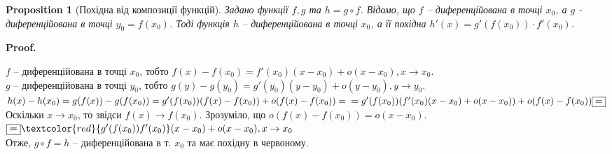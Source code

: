\documentclass[a4paper, 14pt]{article}
\makeatletter
\def\qed{$\blacksquare$}
\theoremstyle{theoremdd}
\theoremstyle{theoremdd}
\theoremstyle{theoremdd}
\theoremstyle{theoremdd}
\theoremstyle{theoremdd}
\newtheorem{proposition}[theorem]{Proposition}
\theoremstyle{theoremdd}
\theoremstyle{theoremdd}
\theoremstyle{theoremdd}
\renewenvironment{proof}[1][Proof.\\]{\par
\pushQED{\hfill \qed}%
\normalfont \topsep6\p@\@plus6\p@\relax
\trivlist
\item\relax
{\bfseries
#1\@addpunct{.}}\hspace\labelsep\ignorespaces
}{%
\popQED\endtrivlist\@endpefalse
}
\makeatother
\begin{document}
\iffalse
\begin{proof}
Альтернативне доведення буде проводитись за допомогою минуло доведеного твердження:\\
1) $(cf)'(x_0) = \displaystyle \lim_{x \to x_0} \frac{cf(x)-cf(x_0)}{x-x_0} = c f'(x_0) \\ \Rightarrow cf$ - диференційована в т. $x_0$.
\bigskip \\
2) $(f+g)'(x_0) = \displaystyle \lim_{x \to x_0} \frac{f(x)+g(x) - f(x_0)-g(x_0)}{x-x_0} = \lim_{x \to x_0} \frac{f(x) - f(x_0)}{x-x_0} + \lim_{x \to x_0} \frac{g(x) - g(x_0)}{x-x_0} = \\ = f'(x_0) + g'(x_0) \\ \Rightarrow f+g$ - диференційована в т. $x_0$.
\bigskip \\
3) $(f \cdot g)'(x_0) = \displaystyle \lim_{x \to x_0} \frac{f(x)g(x) - f(x_0)g(x_0)}{x-x_0} = \lim_{x \to x_0} \frac{f(x)g(x) - f(x_0)g(x) + f(x_0)g(x) - f(x_0)g(x_0)}{x-x_0} = \\ = \lim_{x \to x_0} g(x) \frac{f(x)-f(x_0)}{x-x_0} + f(x_0) \lim_{x \to x_0} \frac{g(x)-g(x_0)}{x-x_0} = f'(x_0)g(x_0) + f(x_0)g'(x_0) \\ \Rightarrow fg$ - диференційована в т. $x_0$.
\bigskip \\
4) $\displaystyle \left(\frac{f}{g}\right)'(x_0) = \lim_{x \to x_0} \frac{\textstyle \frac{f(x)}{g(x)} - \frac{f(x_0)}{g(x_0)}}{x-x_0} = \lim_{x \to x_0} \frac{f(x)g(x_0)-f(x_0)g(x)}{g(x)g(x_0)(x-x_0)} \overset{\textrm{як в 3)}}{=} \frac{1}{(g(x_0))^2} (f'(x_0)g(x_0) - f(x_0)g'(x_0)) \\ \Rightarrow \frac{f}{g}$ - диференційована в т. $x_0$.
\end{proof}
\fi

\begin{proposition}[Похідна від композиції функцій]
Задано функції $f,g$ та $h=g \circ f$. Відомо, що $f$ -- диференційована в точці $x_0$, а $g$ - диференційована в точці $y_0 = f(x_0)$. Тоді функція $h$ -- диференційована в точці $x_0$, а її похідна $h'(x) = g'(f(x_0)) \cdot f'(x_0)$.
\end{proposition}

\begin{proof}
$f$ -- диференційована в точці $x_0$, тобто $f(x)-f(x_0)=f'(x_0)(x-x_0)+o(x-x_0), x \to x_0$.\\
$g$ -- диференційована в точці $y_0$, тобто $g(y)-g(y_0)=g'(y_0)(y-y_0)+o(y-y_0), y \to y_0$.\\
$h(x)-h(x_0) = g(f(x))-g(f(x_0)) = g'(f(x_0))(f(x)-f(x_0))+o(f(x)-f(x_0)) = \\
= g'(f(x_0))(f'(x_0)(x-x_0) + o(x-x_0)) + o(f(x)-f(x_0)) \boxed{=}$\\
Оскільки $x \to x_0$, то звідси $f(x) \to f(x_0)$. Зрозуміло, що $o(f(x)-f(x_0)) = o(x-x_0)$.\\
$\boxed{=} \textcolor{red}{g'(f(x_0))f'(x_0)}(x-x_0) + o(x-x_0), x \to x_0$\\
Отже, $g \circ f = h$ -- диференційована в т. $x_0$ та має похідну в червоному.
\end{proof}
\end{document}
